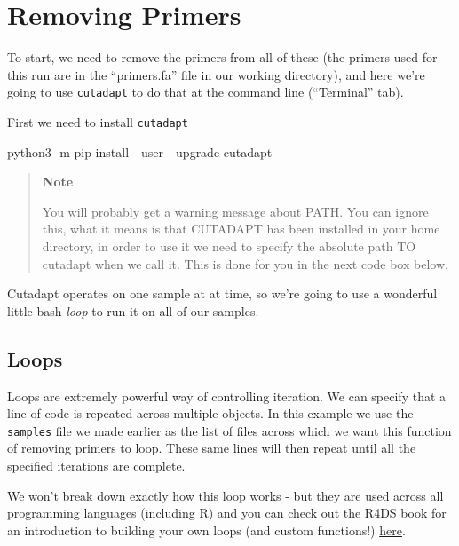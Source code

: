 \documentclass[
]{book}
\newenvironment{Shaded}{\begin{snugshade}}{\end{snugshade}}
\newcommand{\AttributeTok}[1]{\textcolor[rgb]{0.77,0.63,0.00}{#1}}
\newcommand{\ExtensionTok}[1]{#1}
\newcommand{\NormalTok}[1]{#1}
\begin{document}
\hypertarget{removing-primers}{%
\section{Removing Primers}\label{removing-primers}}

To start, we need to remove the primers from all of these (the primers used for this run are in the ``primers.fa'' file in our working directory), and here we're going to use \texttt{cutadapt} to do that at the command line (``Terminal'' tab).

First we need to install \texttt{cutadapt}

\begin{Shaded}
\begin{Highlighting}[]
\ExtensionTok{python3} \AttributeTok{{-}m}\NormalTok{ pip install }\AttributeTok{{-}{-}user} \AttributeTok{{-}{-}upgrade}\NormalTok{ cutadapt}
\end{Highlighting}
\end{Shaded}

\begin{quote}
\textbf{Note}

You will probably get a warning message about PATH. You can ignore this, what it means is that CUTADAPT has been installed in your home directory, in order to use it we need to specify the absolute path TO cutadapt when we call it. This is done for you in the next code box below.
\end{quote}

Cutadapt operates on one sample at at time, so we're going to use a wonderful little bash \emph{loop} to run it on all of our samples.

\hypertarget{loops}{%
\subsection{Loops}\label{loops}}

Loops are extremely powerful way of controlling iteration. We can specify that a line of code is repeated across multiple objects. In this example we use the \texttt{samples} file we made earlier as the list of files across which we want this function of removing primers to loop. These same lines will then repeat until all the specified iterations are complete.

We won't break down exactly how this loop works - but they are used across all programming languages (including R) and you can check out the R4DS book for an introduction to building your own loops (and custom functions!) \href{https://r4ds.had.co.nz/iteration.html}{here}.
\end{document}
